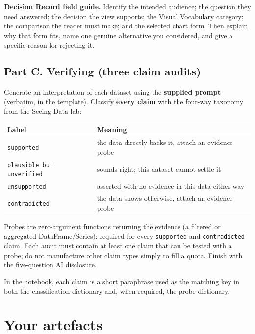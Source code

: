 \documentclass[11pt,a4paper]{article}
\newcommand{\labelbox}[1]{\colorbox{panel}{\texttt{\small #1}}}
\begin{document}
\textbf{Decision Record field guide.} Identify the intended audience; the
question they need answered; the decision the view supports; the Visual
Vocabulary category; the comparison the reader must make; and the selected
chart form. Then explain why that form fits, name one genuine alternative you
considered, and give a specific reason for rejecting it.

\subsection*{Part C. Verifying (three claim audits)}

Generate an interpretation of each dataset using the \textbf{supplied prompt}
(verbatim, in the template). Classify \textbf{every claim} with the four-way
taxonomy from the Seeing Data lab:

\begin{center}
\begin{tabularx}{0.92\textwidth}{@{}l X@{}}
\toprule
\textbf{Label} & \textbf{Meaning} \\
\midrule
\labelbox{supported} & the data directly backs it, attach an evidence probe \\
\labelbox{plausible but unverified} & sounds right; this dataset cannot settle it \\
\labelbox{unsupported} & asserted with no evidence in this data either way \\
\labelbox{contradicted} & the data shows otherwise, attach an evidence probe \\
\bottomrule
\end{tabularx}
\end{center}

Probes are zero-argument functions returning the evidence (a filtered or
aggregated DataFrame/Series): required for every \labelbox{supported} and
\labelbox{contradicted} claim. Each audit must contain at least one claim that
can be tested with a probe; do not manufacture other claim types simply to
fill a quota. Finish with the five-question AI disclosure.

In the notebook, each claim is a short paraphrase used as the matching key in
both the classification dictionary and, when required, the probe dictionary.

\section*{Your artefacts}
\end{document}
